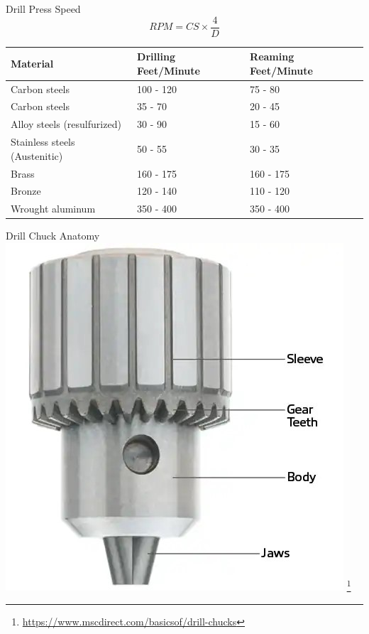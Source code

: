 \documentclass[aspectratio=169]{beamer}
\begin{document}
\begin{frame}{Drill Press Speed}
    $$RPM = CS \times \frac{4}{D}$$
    \centering
    \begin{tabular}{@{}lll@{}}
        \toprule
        Material                      & Drilling Feet/Minute & Reaming Feet/Minute \\\midrule
        Carbon steels                 & 100 - 120            & 75 - 80               \\
        Carbon steels                 & 35 - 70              & 20 - 45               \\
        Alloy steels (resulfurized)   & 30 - 90              & 15 - 60               \\
        Stainless steels (Austenitic) & 50 - 55              & 30 - 35               \\
        Brass                         & 160 - 175            & 160 - 175             \\
        Bronze                        & 120 - 140            & 110 - 120             \\
        Wrought aluminum              & 350 - 400            & 350 - 400            \\ \bottomrule
    \end{tabular}
\end{frame}
\begin{frame}{Drill Chuck Anatomy}
    \centering
    \includegraphics[height=0.7\textheight]{drill_chuck.jpg} \footnote{\url{https://www.mscdirect.com/basicsof/drill-chucks}}
\end{frame}
\end{document}
